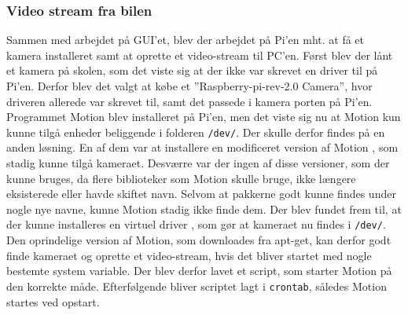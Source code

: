 \subsubsection{Video stream fra bilen}

Sammen med arbejdet på GUI’et, blev der arbejdet på Pi’en mht. at få et kamera installeret samt at oprette et video-stream til PC'en. 
Først blev der lånt et kamera på skolen, som det viste sig at der ikke var skrevet en driver til på Pi'en. 
Derfor blev det valgt at købe et ''Raspberry-pi-rev-2.0 Camera'', hvor driveren allerede var skrevet til, samt det passede i kamera porten på Pi’en. 
Programmet Motion blev installeret på Pi’en, men det viste sig nu at Motion kun kunne tilgå enheder beliggende i folderen \texttt{\//dev/}. 
Der skulle derfor findes på en anden løsning. 
En af dem var at installere en modificeret version af Motion \cite{lib:motion-on-raspberry}, som stadig kunne tilgå kameraet. 
Desværre var der ingen af disse versioner, som der kunne bruges, da flere biblioteker som Motion skulle bruge, ikke længere eksisterede eller havde skiftet navn. 
Selvom at pakkerne godt kunne findes under nogle nye navne, kunne Motion stadig ikke finde dem. 
Der blev fundet frem til, at der kunne installeres en virtuel driver \cite{lib:camera-driver}, som gør at kameraet nu findes i \texttt{\//dev/}. 
Den oprindelige version af Motion, som downloades fra apt-get, kan derfor godt finde kameraet og oprette et video-stream, hvis det bliver startet med nogle bestemte system variable. 
Der blev derfor lavet et script, som starter Motion på den korrekte måde. 
Efterfølgende bliver scriptet lagt i \texttt{crontab}, således Motion startes ved opstart. 